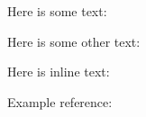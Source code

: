 \documentclass{article}
\begin{document}
Here is some text:

\exampleN



Here is some other text:

\exampleTwoN

Here is inline text: \exampleT

Example reference: \cite{JFP:ooAgda}




\end{document}
